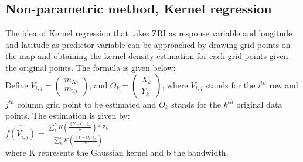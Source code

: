 \documentclass[a4paper]{article}
\begin{document}
\subsection{Non-parametric method, Kernel regression}
The idea of Kernel regression that takes ZRI as response variable and longitude and latitude as predictor variable can be approached by drawing grid points on the map and obtaining the kernel density estimation for each grid points given the original points. The formula is given below:\\
Define 
$V_{i,j}= \begin{pmatrix} 
m_{Xi}\\
m_{Yj}  
\end{pmatrix}$, and $O_{k}= \begin{pmatrix} 
X_{k}\\
Y_{k}  
\end{pmatrix}$, where $V_{i,j}$ stands for the $i^{th}$ row and $j^{th}$ column grid point to be estimated and $O_{k}$ stands for the $k^{th}$ original data points. The estimation is given by:\\
$\hat{f(V_{i,j})} = \frac{\sum_{k}^{n}K(\frac{\|V - O_{k}\|_{2}}{b})*Z_{k}}{\sum_{k}^{n}K(\frac{\|V - O_{k}\|_{2}}{b})}$\\
where K represents the Gaussian kernel and b the bandwidth.
\end{document}
